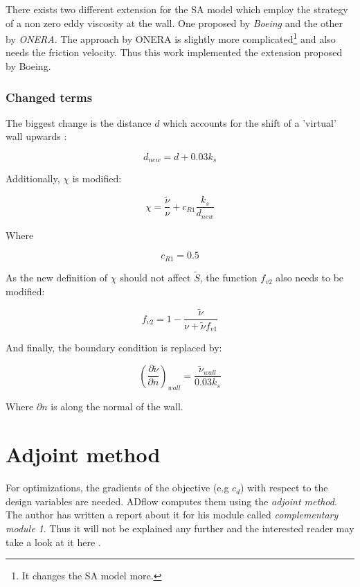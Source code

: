 \noindent There exists two different extension for the SA model which employ the
strategy of a non zero eddy viscosity at the wall. One proposed by
\textit{Boeing} and the other by \textit{ONERA}. The approach by ONERA is
slightly more complicated\footnote{It changes the SA model more.} and also needs
the friction velocity. Thus this work implemented the extension proposed by
Boeing.

\subsubsection{Changed terms}
The biggest change is the distance $d$ which accounts for the shift of a
'virtual' wall upwards \cite{sa_rough}\cite{nasatmr}:

\begin{equation}
  \label{eq:d_new}
  d_{new} = d + 0.03k_{s}
\end{equation}

\noindent Additionally, $\chi$ is modified:

\begin{equation}
  \label{eq:chi_new}
  \chi = \frac{\tilde \nu}{\nu} + c_{R1} \frac{k_{s}}{d_{new}}
\end{equation}

\noindent Where

\begin{equation*}
  c_{R1} = 0.5
\end{equation*}

\noindent As the new definition of $\chi$ should not affect $\tilde S$, the
function $f_{v2}$ also needs to be modified:

\begin{equation}
  \label{eq:fv2_new}
  f_{v2} = 1 - \frac{\tilde \nu}{\nu + \tilde \nu f_{v1}}
\end{equation}

\noindent And finally, the boundary condition is replaced by:

\begin{equation}
  \label{eq:bc_new}
  \left( \frac{\partial \tilde \nu}{\partial n} \right)_{wall} =
  \frac{\tilde \nu_{wall}}{0.03k_s}
\end{equation}

\noindent Where $\partial n$ is along the normal of the wall.



\section{Adjoint method}
For optimizations, the gradients of the objective (e.g $c_{d}$) with respect to
the design variables are needed. ADflow computes them using the \textit{adjoint
method}. The author has written a report about it for his module called \textit{complementary
module 1}.
Thus it will not be explained any further and the interested
reader may take a look at it here \cite{cm1}.



